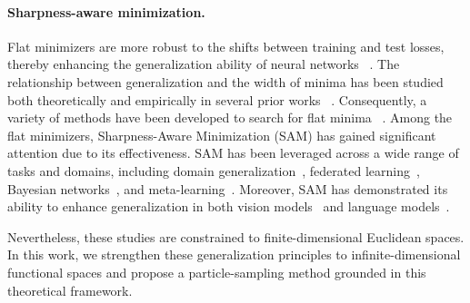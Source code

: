 \paragraph{Sharpness-aware minimization.}
Flat minimizers are more robust to the shifts between training and test losses, thereby enhancing the generalization ability of neural networks ~\citep{DBLP:conf/iclr/JiangNMKB20, DBLP:conf/nips/PetzkaKASB21, DBLP:conf/uai/DziugaiteR17}. The relationship between generalization and the width of minima has been studied both theoretically and empirically in several prior works ~\citep{DBLP:conf/nips/HochreiterS94, neyshabur2017exploring, dinh2017sharp, fort2019emergent}. Consequently, a variety of methods have been developed to search for flat minima ~\citep{DBLP:conf/iclr/PereyraTCKH17, Chaudhari2017EntropySGDBG, keskar2017large, DBLP:conf/uai/IzmailovPGVW18}. Among the flat minimizers, Sharpness-Aware Minimization (SAM) \cite{sam} has gained significant attention due to its effectiveness. SAM has been leveraged across a wide range of tasks and domains, including domain generalization~\citep{cha2021swad, wang2023sharpness, zhang2023flatness}, federated learning~\citep{caldarola2022improving, qu2022generalized}, Bayesian networks~\citep{va2023_flat_Bayes, llenhoff2023sam}, and meta-learning~\citep{abbas2022sharp}. Moreover, SAM has demonstrated its ability to enhance generalization in both vision models~\citep{chen2021vision} and language models~\citep{bahri-etal-2022-sharpness}.

Nevertheless, these studies are constrained to finite-dimensional Euclidean spaces. In this work, we strengthen these generalization principles to infinite-dimensional functional spaces and propose a particle-sampling method grounded in this theoretical framework.

